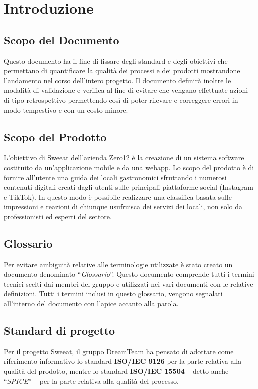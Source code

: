 \section{Introduzione}

\subsection{Scopo del Documento}
Questo documento ha il fine di fissare degli standard e degli obiettivi che permettano di quantificare la qualità dei processi e dei prodotti mostrandone l’andamento nel corso dell’intero progetto.
Il documento definirà inoltre le modalità di validazione e verifica al fine di evitare che vengano effettuate azioni di tipo retrospettivo permettendo così di poter rilevare e correggere errori in modo tempestivo e con un costo minore.

\subsection{Scopo del Prodotto}

L’obiettivo di Sweeat dell’azienda Zero12 è la creazione di un sistema software costituito da un’applicazione mobile e da una webapp. Lo scopo del prodotto è di fornire all’utente una guida dei locali gastronomici sfruttando i numerosi contenuti digitali creati dagli utenti sulle principali piattaforme social (Instagram e TikTok). In questo modo è possibile realizzare una classifica basata sulle impressioni e reazioni di chiunque usufruisca dei servizi dei locali, non solo da professionisti ed esperti del settore.

\subsection{Glossario}

Per evitare ambiguità relative alle terminologie utilizzate è stato creato un documento denominato “\textit{Glossario}”. Questo documento comprende tutti i termini tecnici scelti dai membri del gruppo e utilizzati nei vari documenti con le relative definizioni. Tutti i termini inclusi in questo glossario, vengono segnalati all’interno del documento con l’apice \glo{} accanto alla parola.

\subsection{Standard di progetto}
Per il progetto Sweeat, il gruppo DreamTeam ha pensato di adottare come riferimento informativo lo standard \textbf{ISO/IEC 9126} per la parte relativa alla qualità del prodotto, mentre lo standard \textbf{ISO/IEC 15504} – detto anche “\textit{SPICE}” – per la parte relativa alla qualità del processo.
